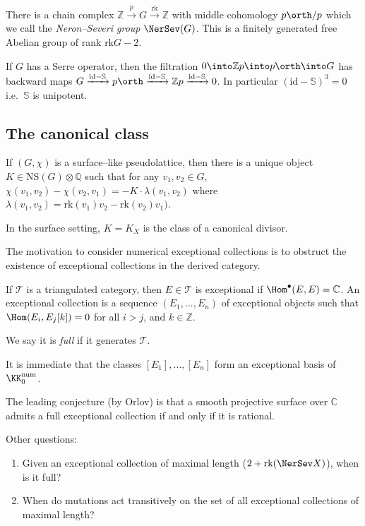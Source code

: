 There is a chain complex \(\mathbb{Z}\xrightarrow{p} G \xrightarrow{\text{rk}}
\mathbb{Z}\) with middle cohomology \(p\orth/p\) which we call the
\emph{Neron--Severi group} \(\NerSev(G)\). This is a finitely generated free
Abelian group of rank \(\text{rk}G-2\).

If \(G\) has a Serre operator, then the filtration \(0\into \mathbb{Z}p\into
p\orth \into G\) has backward maps \(G\xrightarrow{\text{id}-\mathbb{S}}p\orth
\xrightarrow{\text{id}-\mathbb{S}} \mathbb{Z}p
\xrightarrow{\text{id}-\mathbb{S}} 0\). In particular
\((\text{id}-\mathbb{S})^3=0\) i.e.\ \(\mathbb{S}\) is unipotent.

\subsection{The canonical class} If \((G,\chi)\) is a surface--like
pseudolattice, then there is a unique object \(K\in
\text{NS}(G)\otimes\mathbb{Q}\) such that for any \(v_1,v_2\in G\),
\(\chi(v_1,v_2)-\chi(v_2,v_1)= -K \cdot \lambda(v_1,v_2)\)  where
\(\lambda(v_1,v_2)=\text{rk}(v_1)v_2 - \text{rk}(v_2)v_1)\).

In the surface setting, \(K=K_X\) is the class of a canonical divisor.

The motivation to consider numerical exceptional collections is to obstruct
the existence of exceptional collections in the derived category.

\begin{definition}
    If \(\mathscr{T}\) is a triangulated category, then \(E\in \mathscr{T}\) is
    exceptional if \(\Hom^\bullet(E,E)=\mathbb{C}\). An exceptional collection
    is a sequence \((E_1,...,E_n)\) of exceptional objects such that
    \(\Hom(E_i,E_j[k])=0\) for all \(i>j\), and \(k\in \mathbb{Z}\).


    We say it is \emph{full} if it generates \(\mathscr{T}\).
\end{definition}

It is immediate that the classes \([E_1],...,[E_n]\) form an exceptional basis
of \(\KK_0^\text{num}\).

The leading conjecture (by Orlov) is that a smooth projective surface over
\(\mathbb{C}\) admits a full exceptional collection if and only if it is
rational.

Other questions:
\begin{enumerate}
    \item Given an exceptional collection of maximal length
        (\(2+\text{rk}(\NerSev X)\)), when is it full?
    \item When do mutations act transitively on the set of all exceptional
        collections of maximal length?
\end{enumerate}

